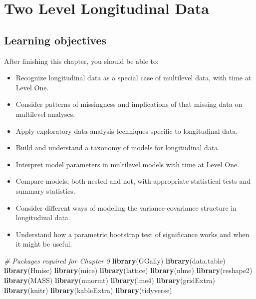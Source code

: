 \documentclass[
]{krantz}
\newenvironment{Shaded}{\begin{snugshade}}{\end{snugshade}}
\newcommand{\CommentTok}[1]{\textcolor[rgb]{0.37,0.37,0.37}{\textit{#1}}}
\newcommand{\KeywordTok}[1]{\textcolor[rgb]{0.27,0.27,0.27}{\textbf{#1}}}
\newcommand{\NormalTok}[1]{#1}
\providecommand{\tightlist}{%
  \setlength{\itemsep}{0pt}\setlength{\parskip}{0pt}}
\begin{document}
\hypertarget{ch-lon}{%
\chapter{Two Level Longitudinal Data}\label{ch-lon}}

\hypertarget{learning-objectives-8}{%
\section{Learning objectives}\label{learning-objectives-8}}

After finishing this chapter, you should be able to:

\begin{itemize}
\tightlist
\item
  Recognize longitudinal data as a special case of multilevel data, with time at Level One.
\item
  Consider patterns of missingness and implications of that missing data on multilevel analyses.
\item
  Apply exploratory data analysis techniques specific to longitudinal data.
\item
  Build and understand a taxonomy of models for longitudinal data.
\item
  Interpret model parameters in multilevel models with time at Level One.
\item
  Compare models, both nested and not, with appropriate statistical tests and summary statistics.
\item
  Consider different ways of modeling the variance-covariance structure in longitudinal data.
\item
  Understand how a parametric bootstrap test of significance works and when it might be useful.
\end{itemize}

\begin{Shaded}
\begin{Highlighting}[]
\CommentTok{# Packages required for Chapter 9}
\KeywordTok{library}\NormalTok{(GGally)}
\KeywordTok{library}\NormalTok{(data.table)}
\KeywordTok{library}\NormalTok{(Hmisc)}
\KeywordTok{library}\NormalTok{(mice)}
\KeywordTok{library}\NormalTok{(lattice)}
\KeywordTok{library}\NormalTok{(nlme)}
\KeywordTok{library}\NormalTok{(reshape2)}
\KeywordTok{library}\NormalTok{(MASS)}
\KeywordTok{library}\NormalTok{(mnormt)}
\KeywordTok{library}\NormalTok{(lme4)}
\KeywordTok{library}\NormalTok{(gridExtra) }
\KeywordTok{library}\NormalTok{(knitr)}
\KeywordTok{library}\NormalTok{(kableExtra)}
\KeywordTok{library}\NormalTok{(tidyverse)}
\end{Highlighting}
\end{Shaded}
\end{document}
